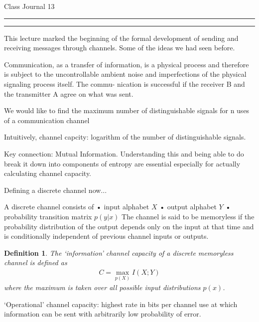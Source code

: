 \documentclass{article}
\newtheorem{definition}{Definition}
\newcounter{questionCounter}
\newcounter{partCounter}[questionCounter]
\newenvironment{question}[2][\arabic{questionCounter}]{%
    \setcounter{partCounter}{0}%
    \vspace{.25in} \hrule \vspace{0.5em}%
        \noindent{\bf \large#2}%
    \vspace{0.5em} \hrule \vspace{.10in}%
    \addtocounter{questionCounter}{1}%
}{}
\begin{document}
\begin{center}
{\Huge Class Journal 13}\\
\end{center}

\vspace{5mm}


\vspace{5mm}


\begin{question}{Main Theorems/Ideas in the lecture}
This lecture marked the beginning of the formal development of sending and receiving messages through channels. Some of the ideas we had seen before.

Communication, as a transfer of information, is a physical process and therefore is subject to the
uncontrollable ambient noise and imperfections of the physical signaling process itself. The commu-
nication is successful if the receiver B and the transmitter A agree on what was sent.

We would like to find the maximum number of distinguishable signals for n uses of a communication channel

Intuitively, channel capcity: logarithm of the number of distinguishable signals.

Key connection: Mutual Information. Understanding this and being able to do break it down into components of entropy are essential especially for actually calculating channel capacity.

Defining a discrete channel now...

A discrete channel consists of\newline
• input alphabet $X$\newline
• output alphabet $Y$\newline
• probability transition matrix $p(y|x)$\newline
The channel is said to be memoryless if the probability distribution of the output depends only on the
input at that time and is conditionally independent of previous channel inputs or outputs.

\begin{definition} The ‘information’ channel capacity of a discrete memoryless channel is defined as \begin{gather*}
    C = \max_{p(X)} I(X;Y)
\end{gather*}
where the maximum is taken over all possible input distributions $p(x)$.
\end{definition}
\remark ‘Operational’ channel capacity: highest rate in bits per channel use at which information can
be sent with arbitrarily low probability of error.


\end{question}
\end{document}
